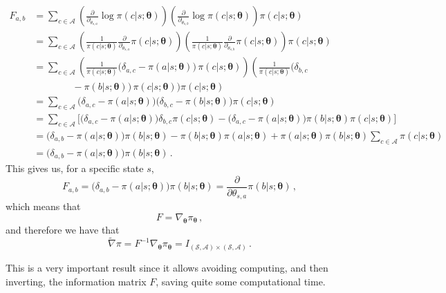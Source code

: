 \begin{align*}
    F_{a,b}
    &= \sum_{c \in \mathcal A} \left( \frac{\partial}{\partial_{\theta_{s,a}}} \log \pi(c|s; \boldsymbol \theta) \right) \left( \frac{\partial}{\partial_{\theta_{s,b}}} \log \pi(c|s; \boldsymbol \theta) \right) \pi(c|s; \boldsymbol \theta) \\
    &= \sum_{c \in \mathcal A} \left( \frac1{\pi(c|s; \boldsymbol \theta)} \frac{\partial}{\partial_{\theta_{s,a}}} \pi(c|s; \boldsymbol \theta) \right) \left( \frac1{\pi(c|s; \boldsymbol \theta)} \frac{\partial}{\partial_{\theta_{s,b}}} \pi(c|s; \boldsymbol \theta) \right) \pi(c|s; \boldsymbol \theta) \\
    &= \sum_{c \in \mathcal A} \left( \frac1{\pi(c|s; \boldsymbol \theta)} \big( \delta_{a,c} - \pi(a|s; \boldsymbol \theta) \big) \, \pi(c|s; \boldsymbol \theta) \right) \left( \frac1{\pi(c|s; \boldsymbol \theta)} \big( \delta_{b,c} \right.\\
    & \qquad\qquad  - \pi(b|s; \boldsymbol \theta) \big) \, \pi(c|s; \boldsymbol \theta) \bigg) \pi(c|s; \boldsymbol \theta) \\
    &= \sum_{c \in \mathcal A} \big( \delta_{a,c} - \pi(a|s; \boldsymbol \theta) \big) \big( \delta_{b,c} - \pi(b|s; \boldsymbol \theta) \big) \pi(c|s; \boldsymbol \theta) \\
    &= \sum_{c \in \mathcal A} \big[ \big( \delta_{a,c} - \pi(a|s; \boldsymbol \theta) \big) \delta_{b,c} \pi(c|s; \boldsymbol \theta) - \big( \delta_{a,c} - \pi(a|s; \boldsymbol \theta) \big) \pi(b|s; \boldsymbol \theta) \pi(c|s; \boldsymbol \theta) \big]\\
    &= \big( \delta_{a,b} - \pi(a|s; \boldsymbol \theta) \big) \pi(b|s; \boldsymbol \theta) - \pi(b|s; \boldsymbol \theta) \pi(a|s; \boldsymbol \theta) + \pi(a|s; \boldsymbol \theta) \pi(b|s; \boldsymbol \theta) \sum_{c \in \mathcal A} \pi(c|s; \boldsymbol \theta) \\
    &= \big( \delta_{a,b} - \pi(a|s; \boldsymbol \theta) \big) \pi(b|s; \boldsymbol \theta) \, .
\end{align*}
This gives us, for a specific state $s$,
\begin{equation}
    F_{a,b} = \big( \delta_{a,b} - \pi(a|s; \boldsymbol \theta) \big) \pi(b|s; \boldsymbol \theta) = \frac{\partial}{\partial \theta_{s, a}} \pi(b | s; \boldsymbol \theta) \, ,
\end{equation}
which means that
\begin{equation}
    F = \nabla_{\boldsymbol \theta} \pi_{\boldsymbol \theta} \, ,
\end{equation}
and therefore we have that
\begin{equation}
    \widetilde \nabla \pi = F^{-1} \nabla_{\boldsymbol \theta} \pi_{\boldsymbol \theta} =  I_{(\mathcal S, \mathcal A) \times (\mathcal S, \mathcal A)} \, .
    \label{eq:nat-grad-pi}
\end{equation}

This is a very important result since it allows avoiding computing, and then inverting, the information matrix $F$, saving quite some computational time.
